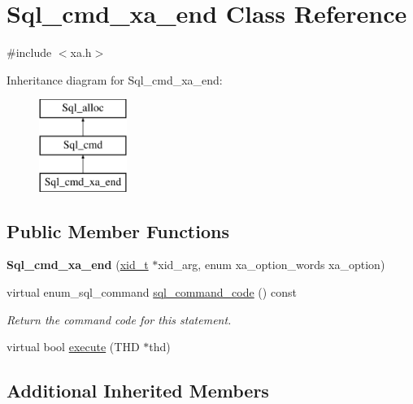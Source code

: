 \hypertarget{classSql__cmd__xa__end}{}\section{Sql\+\_\+cmd\+\_\+xa\+\_\+end Class Reference}
\label{classSql__cmd__xa__end}


{\ttfamily \#include $<$xa.\+h$>$}

Inheritance diagram for Sql\+\_\+cmd\+\_\+xa\+\_\+end\+:\begin{figure}[H]
\begin{center}
\leavevmode
\includegraphics[height=3.000000cm]{classSql__cmd__xa__end}
\end{center}
\end{figure}
\subsection*{Public Member Functions}
\begin{DoxyCompactItemize}
\item 
\mbox{\label{classSql__cmd__xa__end_a0d0c9c30402910413682e4f6476081df}} 
{\bfseries Sql\+\_\+cmd\+\_\+xa\+\_\+end} (\mbox{\hyperlink{structxid__t}{xid\+\_\+t}} $\ast$xid\+\_\+arg, enum xa\+\_\+option\+\_\+words xa\+\_\+option)
\item 
\mbox{\label{classSql__cmd__xa__end_ae7ce6fc33852002157062d40147db4c7}} 
virtual enum\+\_\+sql\+\_\+command \mbox{\hyperlink{classSql__cmd__xa__end_ae7ce6fc33852002157062d40147db4c7}{sql\+\_\+command\+\_\+code}} () const
\begin{DoxyCompactList}\small\item\em Return the command code for this statement. \end{DoxyCompactList}\item 
virtual bool \mbox{\hyperlink{classSql__cmd__xa__end_a82de55b8107137497f77ce51a9d16fad}{execute}} (T\+HD $\ast$thd)
\end{DoxyCompactItemize}
\subsection*{Additional Inherited Members}


